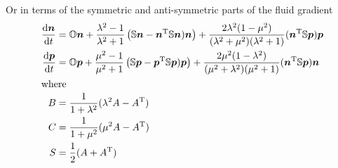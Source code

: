 \documentclass[thesis.tex]{subfiles}
\begin{document}
Or in terms of the symmetric and anti-symmetric parts of the fluid gradient
\begin{align*}
	\frac{\mathrm{d} \mbox{\boldmath$n$}}{\mathrm{d} t} &= \mathbb{O} \mbox{\boldmath$n$} + \frac{\lambda^2-1}{\lambda^2+1} \left(\mathbb{S} \mbox{\boldmath$n$}- \mbox{\boldmath$n$}^{\mathrm T} \mathbb{S} \mbox{\boldmath$n$})\mbox{\boldmath$n$}\right) + \frac{ 2\lambda^2 (1 - \mu^2) }{(\lambda^2+\mu^2)(\lambda^2+1)}(\mbox{\boldmath$n$}^{\mathrm T} \mathbb{S} \mbox{\boldmath$p$})\mbox{\boldmath$p$} \\
	\frac{\mathrm{d} \mbox{\boldmath$p$}}{\mathrm{d} t} &= \mathbb{O} \mbox{\boldmath$p$} + \frac{\mu^2-1}{\mu^2+1}\left(\mathbb{S} \mbox{\boldmath$p$} - \mbox{\boldmath$p$}^{\mathrm T} \mathbb{S} \mbox{\boldmath$p$})\mbox{\boldmath$p$}\right) + \frac{ 2\mu^2 (1 - \lambda^2) }{(\mu^2+\lambda^2)(\mu^2+1)}(\mbox{\boldmath$n$}^{\mathrm T} \mathbb{S} \mbox{\boldmath$p$})\mbox{\boldmath$n$} \\
	\intertext{where}
	B &= \frac{1}{1+\lambda^2}(\lambda^2 A - A^{\mathrm T}) \\
	C &= \frac{1}{1+\mu^2}(\mu^2 A - A^{\mathrm T}) \\
	S &= \frac{1}{2}(A + A^{\mathrm T})
\end{align*}
\end{document}
